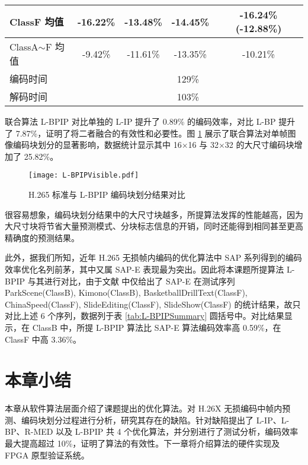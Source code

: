 \begin{table}[!p]
\begin{minipage}{\linewidth}
\begin{tabular}{@{}clcccc@{}}
            \multicolumn{2}{l}{ClassF 均值}        & -16.22\%                                  & -13.48\%                 & -14.45\% & -16.24\% (-12.88\%)                                                                                                                       \\ \midrule
            \multicolumn{2}{l}{ClassA$\sim$F 均值} & -9.42\%                                   & -11.61\%                 & -13.35\% & -10.21\%                                                                                                                                  \\ \midrule
            \multicolumn{2}{l}{编码时间}           & \multicolumn{4}{c}{129\%}                                                                                                                                                                                                   \\ \midrule
            \multicolumn{2}{l}{解码时间}           & \multicolumn{4}{c}{103\%}                                                                                                                                                                                                   \\ \bottomrule
        \end{tabular}
    \end{minipage}
\end{table}
联合算法 L-BPIP 对比单独的 L-IP 提升了 0.89\% 的编码效率，对比 L-BP 提升了 7.87\%，证明了将二者融合的有效性和必要性。图 \ref{fig:L-BPIPVisible} 展示了联合算法对单帧图像编码块划分的显著影响，数据统计显示其中 16$\times$16 与 32$\times$32 的大尺寸编码块增加了 25.82\%。
\begin{figure}[hbt]
    \centering
    \texttt{[image: L-BPIPVisible.pdf]}
    \caption{H.265 标准与 L-BPIP 编码块划分结果对比}
    \label{fig:L-BPIPVisible}
\end{figure}
很容易想象，编码块划分结果中的大尺寸块越多，所提算法发挥的性能越高，因为大尺寸块将节省大量预测模式、分块标志信息的开销，同时还能得到相同甚至更高精确度的预测结果。

此外，据我们所知，近年 H.265 无损帧内编码的优化算法中 SAP 系列得到的编码效率优化名列前茅，其中又属 SAP-E 表现最为突出。因此将本课题所提算法 L-BPIP 与其进行对比，由于文献 \cite{pwmResidualsPiecewiseMapping} 中仅给出了 SAP-E 在测试序列 ParkScene(ClassB), Kimono(ClassB), BasketballDrillText(ClassF), ChinaSpeed(ClassF), SlideEditing(ClassF), SlideShow(ClassF) 的统计结果，故只对比上述 6 个序列，数据列于表 \ref{tab:L-BPIPSummary} 圆括号中。对比结果显示，在 ClassB 中，所提 L-BPIP 算法比 SAP-E 算法编码效率高 0.59\%，在 ClassF 中高 3.36\%。

\section{本章小结}
本章从软件算法层面介绍了课题提出的优化算法。对 H.26X 无损编码中帧内预测、编码块划分过程进行分析，研究其存在的缺陷。针对缺陷提出了 L-IP、L-BP、R-MED 以及 L-BPIP 共 4 个优化算法，并分别进行了测试分析，编码效率最大提高超过 10\%，证明了算法的有效性。下一章将介绍算法的硬件实现及 FPGA 原型验证系统。